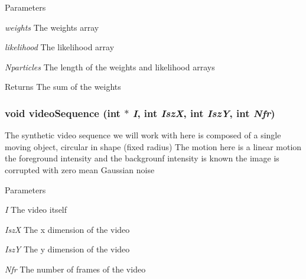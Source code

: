 \begin{DoxyParams}{Parameters}
\item[{\em weights}]The weights array \item[{\em likelihood}]The likelihood array \item[{\em Nparticles}]The length of the weights and likelihood arrays \end{DoxyParams}
\begin{DoxyReturn}{Returns}
The sum of the weights 
\end{DoxyReturn}
\hypertarget{ex__particle__CUDA__float_8cu_a675031ba0ebec137152999f4d153261e}{
\subsubsection[{videoSequence}]{\setlength{\rightskip}{0pt plus 5cm}void videoSequence (int $\ast$ {\em I}, \/  int {\em IszX}, \/  int {\em IszY}, \/  int {\em Nfr})}}
\label{ex__particle__CUDA__float_8cu_a675031ba0ebec137152999f4d153261e}
The synthetic video sequence we will work with here is composed of a single moving object, circular in shape (fixed radius) The motion here is a linear motion the foreground intensity and the backgrounf intensity is known the image is corrupted with zero mean Gaussian noise 
\begin{DoxyParams}{Parameters}
\item[{\em I}]The video itself \item[{\em IszX}]The x dimension of the video \item[{\em IszY}]The y dimension of the video \item[{\em Nfr}]The number of frames of the video \end{DoxyParams}
